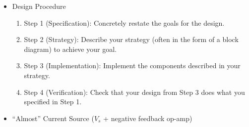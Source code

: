 \documentclass{article}
\begin{document}
\begin{itemize}
	\item Design Procedure
	\begin{enumerate}
		\item Step 1 (Specification): Concretely restate the goals for the design.
		\item Step 2 (Strategy): Describe your strategy (often in the form of a block diagram) to achieve your goal.
		\item Step 3 (Implementation): Implement the components described in your strategy.
		\item Step 4 (Verification): Check that your design from Step 3 does what you specified in Step 1.
	\end{enumerate}
	\item ``Almost'' Current Source ($V_s$ + negative feedback op-amp)
\end{itemize}
\end{document}
